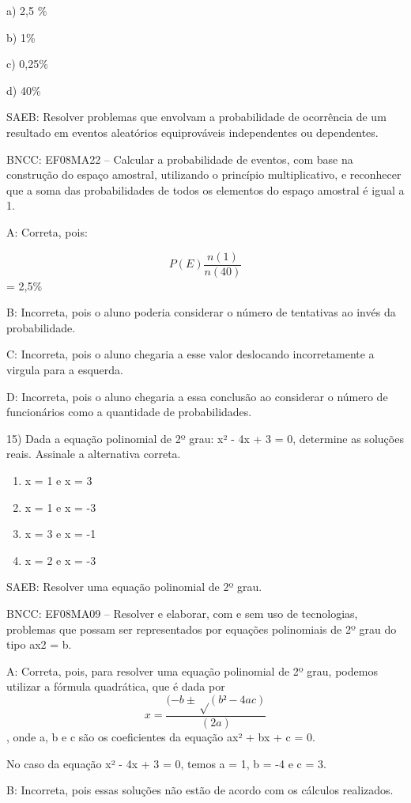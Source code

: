 a) 2,5 \%

b) 1\%

c) 0,25\%

d) 40\%

SAEB: Resolver problemas que envolvam a probabilidade de ocorrência de
um resultado em eventos aleatórios equiprováveis independentes ou
dependentes.

BNCC: EF08MA22 -- Calcular a probabilidade de eventos, com base na
construção do espaço amostral, utilizando o princípio multiplicativo, e
reconhecer que a soma das probabilidades de todos os elementos do espaço
amostral é igual a 1.

A: Correta, pois:

\[P(E)\frac{n(1)}{n(40)}\]= 2,5\%

B: Incorreta, pois o aluno poderia considerar o número de tentativas ao
invés da probabilidade.

C: Incorreta, pois o aluno chegaria a esse valor deslocando
incorretamente a virgula para a esquerda.

D: Incorreta, pois o aluno chegaria a essa conclusão ao considerar o
número de funcionários como a quantidade de probabilidades.

15) Dada a equação polinomial de 2º grau: x² - 4x + 3 = 0, determine as
soluções reais. Assinale a alternativa correta.

\begin{enumerate}
\def\labelenumi{\alph{enumi})}
\item
  x = 1 e x = 3
\item
  x = 1 e x = -3
\item
  x = 3 e x = -1
\item
  x = 2 e x = -3
\end{enumerate}

SAEB: Resolver uma equação polinomial de 2º grau.

BNCC: EF08MA09 -- Resolver e elaborar, com e sem uso de tecnologias,
problemas que possam ser representados por equações polinomiais de 2º
grau do tipo ax2 = b.

A: Correta, pois, para resolver uma equação polinomial de 2º grau,
podemos utilizar a fórmula quadrática, que é dada por
\[x = \frac {(-b ± √(b² - 4ac)} {(2a)}\], onde a, b e c são os
coeficientes da equação ax² + bx + c = 0.

No caso da equação x² - 4x + 3 = 0, temos a = 1, b = -4 e c = 3.

B: Incorreta, pois essas soluções não estão de acordo com os cálculos
realizados.

